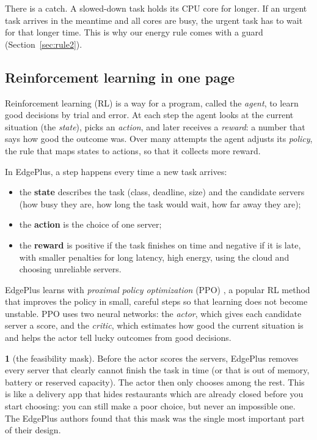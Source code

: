 \documentclass[11pt]{article}
\theoremstyle{definition}
\newcommand{\textblockname}{}
\newtheorem*{textblock*}{\textblockname}
\newenvironment{plainwords}{%
  \renewcommand{\textblockname}{In simple words}%
  \def\FrameCommand{{\color{accent}\vrule width 2.25pt}\hspace{8pt}}%
  \MakeFramed{\advance\hsize-10.25pt\FrameRestore}%
  \begin{textblock*}}{\end{textblock*}%
  \endMakeFramed}
\begin{document}
There is a catch. A slowed-down task holds its CPU core for longer. If an urgent task arrives in the meantime and
all cores are busy, the urgent task has to wait for that longer time. This is why our energy rule comes with a
guard (Section~\ref{sec:rule2}).

\subsection{Reinforcement learning in one page}
Reinforcement learning (RL) is a way for a program, called the \emph{agent}, to learn good decisions by trial and
error. At each step the agent looks at the current situation (the \emph{state}), picks an \emph{action}, and later
receives a \emph{reward}: a number that says how good the outcome was. Over many attempts the agent adjusts its
\emph{policy}, the rule that maps states to actions, so that it collects more reward.

In EdgePlus, a step happens every time a new task arrives:
\begin{itemize}
\item the \textbf{state} describes the task (class, deadline, size) and the candidate servers (how busy they are,
how long the task would wait, how far away they are);
\item the \textbf{action} is the choice of one server;
\item the \textbf{reward} is positive if the task finishes on time and negative if it is late, with smaller
penalties for long latency, high energy, using the cloud and choosing unreliable servers.
\end{itemize}
EdgePlus learns with \emph{proximal policy optimization} (PPO) \cite{schulman2017ppo}, a popular RL method that
improves the policy in small, careful steps so that learning does not become unstable. PPO uses two neural
networks: the \emph{actor}, which gives each candidate server a score, and the \emph{critic}, which estimates how
good the current situation is and helps the actor tell lucky outcomes from good decisions.

\begin{plainwords}[the feasibility mask]
Before the actor scores the servers, EdgePlus removes every server that clearly cannot finish the task in time
(or that is out of memory, battery or reserved capacity). The actor then only chooses among the rest. This is
like a delivery app that hides restaurants which are already closed before you start choosing: you can still
make a poor choice, but never an impossible one. The EdgePlus authors found that this mask was the single most
important part of their design.
\end{plainwords}
\end{document}
